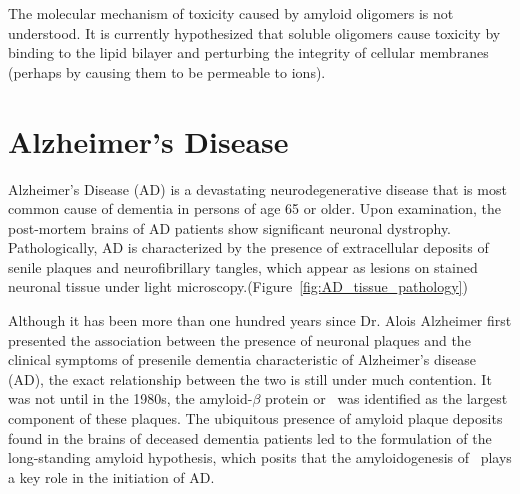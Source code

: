 The molecular mechanism of toxicity caused by amyloid oligomers is not understood. %
It is currently hypothesized that soluble oligomers cause toxicity by binding to the lipid bilayer and perturbing the integrity of cellular membranes (perhaps by causing them to be permeable to ions).\cite{Martins:2008bz,Walsh:2007fu}



\section{Alzheimer's Disease}
Alzheimer's Disease (AD) is a devastating neurodegenerative disease that is most common cause of dementia in persons of age 65 or older.  Upon examination, the post-mortem brains of AD patients show significant neuronal dystrophy.  Pathologically, AD is characterized by the presence of extracellular deposits of senile plaques and neurofibrillary tangles, which appear as lesions on stained neuronal tissue under light microscopy.(Figure~\ref{fig:AD_tissue_pathology})

Although it has been more than one hundred years since Dr. Alois Alzheimer first presented the association between the presence of neuronal plaques and the clinical symptoms of presenile dementia characteristic of Alzheimer's disease (AD), the exact relationship between the two is still under much contention.  It was not until in the 1980s, the amyloid-$\beta$ protein or \abeta\ was identified as the largest component of these plaques. The ubiquitous presence of amyloid plaque deposits found in the brains of deceased dementia patients led to the formulation of the long-standing amyloid hypothesis, which posits that the amyloidogenesis of \abeta\ plays a key role in the initiation of AD.\cite{Hardy:2002dh}


